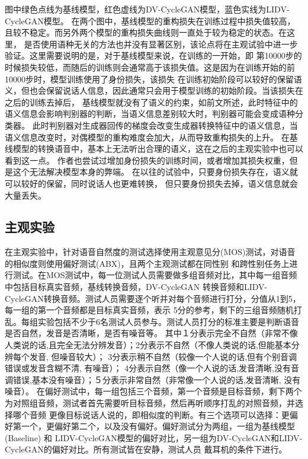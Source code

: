 图中绿色点线为基线模型，红色虚线为DV-CycleGAN模型，蓝色实线为LIDV-CycleGAN模型。
在两个图中，基线模型的重构损失在训练过程中损失值较高，且较不稳定。而另外两个模型的重构损失曲线则一直处于较为稳定的状态。在这里，
是否使用语种无关的方法也并没有显著区别，该论点将在主观试验中进一步验证。这里需要说明的是，对于基线模型来说，在训练的一开始，即
第10000步的时候损失较低，而随后的训练则会通常高于该损失值。这是因为在训练开始的前10000步时，模型训练使用了身份损失，该损失
在训练初始阶段可以较好的保留语义，但也会保留说话人信息，因此通常只会用于模型训练的初始阶段。当该损失在之后的训练去掉后，
基线模型就没有了语义的约束，如前文所述，此时特征中的语义信息会影响判别器的判断，当语义信息差别较大时，判别器可能会变成语种分类器。
此时判别器对生成器回传的梯度会改变生成器转换特征中的语义信息，当语义信息改变时，对偶模型的重构难度会加大，从而导致重构损失的上升。
在基线模型的转换语音中，基本上无法听出合理的语义，这在之后的主观实验中也可以看到这一点。
作者也尝试过增加身份损失的训练时间，或者增加其损失权重，但是这个无法解决模型本身的弊端。
在以往的试验中，只要身份损失存在，语义就可以较好的保留，同时说话人也更难转换，
但只要身份损失去掉，语义信息就会大量丢失。

\subsection{主观实验}
在主观实验中，针对语音自然度的测试选择使用主观意见分(MOS)测试，对语音的相似度则使用偏好测试(ABX)，且两个主观测试都在同性别
和跨性别任务上进行测试。在MOS测试中，每一位测试人员需要做多组音频对比，其中每一组音频中包括目标真实音频，基线转换音频，DV-CycleGAN
转换音频和LIDV-CycleGAN转换音频。测试人员需要逐个听并对每个音频进行打分，分值从1到5，每一组的第一个音频都是目标真实音频，表示
5分的参考，剩下的三组音频随机打乱。每组实验包括不少于6名测试人员参与。测试人员打分的标准主要是判断语音是否自然，发音是否清晰，是否有噪音等。
其中１分表示完全不自然（非常不像人类说的话,且完全无法分辨发音）；2分表示不自然（不像人类说的话,但能基本分辨每个发音, 但噪音较大）；
3分表示稍不自然（较像一个人说的话,但有个别音调错误或发音含糊不清, 有噪音）；
4分表示自然（像一个人说的话,发音清晰,没有音调错误,基本没有噪音）；５分表示非常自然（非常像一个人说的话,发音清晰, 没有噪音）。
在偏好测试中，每一组包括三个音频，第一个音频是目标音频，剩下两个为对照组音频，测试者首先需要听目标音频，然后再听顺序打乱的对照音频，并选择哪个音频
更像目标说话人说的，即相似度的判断。有三个选项可以选择：更偏好第一个，更偏好第二个，以及没有偏好。偏好测试分为两组，一组为基线模型 (Baseline) 和
LIDV-CycleGAN模型的偏好对比，另一组为DV-CycleGAN和LIDV-CycleGAN的偏好对比。所有测试皆在安静，测试人员
戴耳机的条件下进行。

